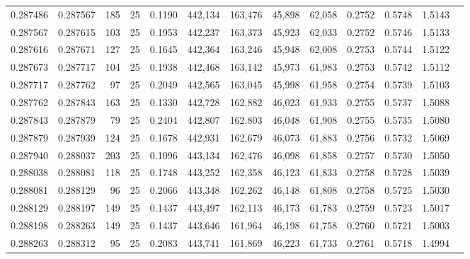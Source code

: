 \begin{tabular}{rrrrrrrrrrrrr}
0.287486 & 0.287567 &   185 &  25 &                                     0.1190 & 442,134 & 163,476 &  45,898 &  62,058 & 0.2752 & 0.5748 & 1.5143 \\
0.287567 & 0.287615 &   103 &  25 &                                     0.1953 & 442,237 & 163,373 &  45,923 &  62,033 & 0.2752 & 0.5746 & 1.5133 \\
0.287616 & 0.287671 &   127 &  25 &                                     0.1645 & 442,364 & 163,246 &  45,948 &  62,008 & 0.2753 & 0.5744 & 1.5122 \\
0.287673 & 0.287717 &   104 &  25 &                                     0.1938 & 442,468 & 163,142 &  45,973 &  61,983 & 0.2753 & 0.5742 & 1.5112 \\
0.287717 & 0.287762 &    97 &  25 &                                     0.2049 & 442,565 & 163,045 &  45,998 &  61,958 & 0.2754 & 0.5739 & 1.5103 \\
0.287762 & 0.287843 &   163 &  25 &                                     0.1330 & 442,728 & 162,882 &  46,023 &  61,933 & 0.2755 & 0.5737 & 1.5088 \\
0.287843 & 0.287879 &    79 &  25 &                                     0.2404 & 442,807 & 162,803 &  46,048 &  61,908 & 0.2755 & 0.5735 & 1.5080 \\
0.287879 & 0.287939 &   124 &  25 &                                     0.1678 & 442,931 & 162,679 &  46,073 &  61,883 & 0.2756 & 0.5732 & 1.5069 \\
0.287940 & 0.288037 &   203 &  25 &                                     0.1096 & 443,134 & 162,476 &  46,098 &  61,858 & 0.2757 & 0.5730 & 1.5050 \\
0.288038 & 0.288081 &   118 &  25 &                                     0.1748 & 443,252 & 162,358 &  46,123 &  61,833 & 0.2758 & 0.5728 & 1.5039 \\
0.288081 & 0.288129 &    96 &  25 &                                     0.2066 & 443,348 & 162,262 &  46,148 &  61,808 & 0.2758 & 0.5725 & 1.5030 \\
0.288129 & 0.288197 &   149 &  25 &                                     0.1437 & 443,497 & 162,113 &  46,173 &  61,783 & 0.2759 & 0.5723 & 1.5017 \\
0.288198 & 0.288263 &   149 &  25 &                                     0.1437 & 443,646 & 161,964 &  46,198 &  61,758 & 0.2760 & 0.5721 & 1.5003 \\
0.288263 & 0.288312 &    95 &  25 &                                     0.2083 & 443,741 & 161,869 &  46,223 &  61,733 & 0.2761 & 0.5718 & 1.4994 \\

\end{tabular}
